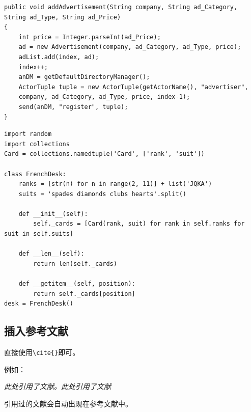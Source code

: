 \documentclass[12pt,a4paper,UTF8,fontset=none]{ctexart}
\begin{document}
\begin{lstlisting}[style=Java, title="Java代码"]
public void addAdvertisement(String company, String ad_Category, String ad_Type, String ad_Price)
{
    int price = Integer.parseInt(ad_Price);
    ad = new Advertisement(company, ad_Category, ad_Type, price);
    adList.add(index, ad);
    index++;
    anDM = getDefaultDirectoryManager();
    ActorTuple tuple = new ActorTuple(getActorName(), "advertiser",
    company, ad_Category, ad_Type, price, index-1);
    send(anDM, "register", tuple);
}
\end{lstlisting}

\begin{lstlisting}[style=Python, title="Python代码"]                
import random
import collections
Card = collections.namedtuple('Card', ['rank', 'suit'])

class FrenchDesk:
    ranks = [str(n) for n in range(2, 11)] + list('JQKA')
    suits = 'spades diamonds clubs hearts'.split()
    
    def __init__(self):
        self._cards = [Card(rank, suit) for rank in self.ranks for suit in self.suits]
        
    def __len__(self):
        return len(self._cards)
        
    def __getitem__(self, position):
        return self._cards[position]
desk = FrenchDesk()
\end{lstlisting}

\subsection{插入参考文献}
直接使用\verb|\cite{}|即可\cite{DBLP:conf/nips/VaswaniSPUJGKP17}。

例如：


   \textit{ 此处引用了文献\cite{0Isaac}。此处引用了文献\cite{2016The}}


引用过的文献会自动出现在参考文献中。



\end{document}

